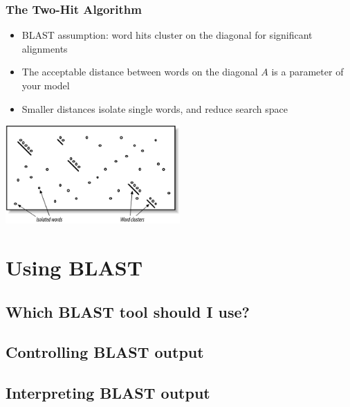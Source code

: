 \documentclass[table]{beamer}
\begin{document}
  \begin{frame}
    \frametitle{The Two-Hit Algorithm}
    \begin{itemize}
      \item BLAST assumption: word hits cluster on the diagonal for significant alignments
      \item The acceptable distance between words on the diagonal $A$ is a parameter of your model
      \item Smaller distances isolate single words, and reduce search space
    \end{itemize}
    \begin{center}
      \includegraphics[width=0.5\textwidth]{images/two_hit} 
    \end{center}    
  \end{frame}


  
  \section{Using BLAST}
    \subsection{Which BLAST tool should I use?}
    \begin{frame}
     \frametitle{}
    \end{frame}

    \subsection{Controlling BLAST output}
    \begin{frame}
     \frametitle{}
    \end{frame}
     
    \subsection{Interpreting BLAST output}
    \begin{frame}
     \frametitle{}
    \end{frame}
    
\end{document}
